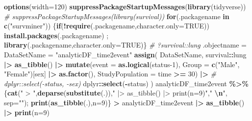 \documentclass[
]{article}
\newenvironment{Shaded}{\begin{snugshade}}{\end{snugshade}}
\newcommand{\AttributeTok}[1]{\textcolor[rgb]{0.13,0.29,0.53}{#1}}
\newcommand{\CommentTok}[1]{\textcolor[rgb]{0.56,0.35,0.01}{\textit{#1}}}
\newcommand{\ConstantTok}[1]{\textcolor[rgb]{0.56,0.35,0.01}{#1}}
\newcommand{\ControlFlowTok}[1]{\textcolor[rgb]{0.13,0.29,0.53}{\textbf{#1}}}
\newcommand{\DecValTok}[1]{\textcolor[rgb]{0.00,0.00,0.81}{#1}}
\newcommand{\FunctionTok}[1]{\textcolor[rgb]{0.13,0.29,0.53}{\textbf{#1}}}
\newcommand{\NormalTok}[1]{#1}
\newcommand{\OtherTok}[1]{\textcolor[rgb]{0.56,0.35,0.01}{#1}}
\newcommand{\SpecialCharTok}[1]{\textcolor[rgb]{0.81,0.36,0.00}{\textbf{#1}}}
\newcommand{\StringTok}[1]{\textcolor[rgb]{0.31,0.60,0.02}{#1}}
\begin{document}
\begin{Shaded}
\begin{Highlighting}[]
\FunctionTok{options}\NormalTok{(}\AttributeTok{width=}\DecValTok{120}\NormalTok{)}
\FunctionTok{suppressPackageStartupMessages}\NormalTok{(}\FunctionTok{library}\NormalTok{(tidyverse))}
\CommentTok{\# suppressPackageStartupMessages(library(survival))}
\ControlFlowTok{for}\NormalTok{(.packagename }\ControlFlowTok{in} \FunctionTok{c}\NormalTok{(}\StringTok{"survminer"}\NormalTok{)) \{}\ControlFlowTok{if}\NormalTok{(}\SpecialCharTok{!}\FunctionTok{require}\NormalTok{(.packagename,}\AttributeTok{character.only=}\ConstantTok{TRUE}\NormalTok{)) }\FunctionTok{install.packages}\NormalTok{(.packagename)  ;  }\FunctionTok{library}\NormalTok{(.packagename,}\AttributeTok{character.only=}\ConstantTok{TRUE}\NormalTok{)\}  }
\CommentTok{\# ?survival::lung}
\NormalTok{.objectname }\OtherTok{=}\NormalTok{ DataSetName }\OtherTok{=} \StringTok{"analyticDF\_time2event"}
\FunctionTok{assign}\NormalTok{(}
\NormalTok{    DataSetName, }
\NormalTok{    survival}\SpecialCharTok{::}\NormalTok{lung }\SpecialCharTok{|\textgreater{}} \FunctionTok{as\_tibble}\NormalTok{() }\SpecialCharTok{|\textgreater{}} \FunctionTok{mutate}\NormalTok{(}\AttributeTok{event =} \FunctionTok{as.logical}\NormalTok{(status}\DecValTok{{-}1}\NormalTok{), }\AttributeTok{Group =} \FunctionTok{c}\NormalTok{(}\StringTok{"Male"}\NormalTok{, }\StringTok{"Female"}\NormalTok{)[sex] }\SpecialCharTok{|\textgreater{}} \FunctionTok{as.factor}\NormalTok{(), }\AttributeTok{StudyPopulation =}\NormalTok{ time }\SpecialCharTok{\textgreater{}=} \DecValTok{30}\NormalTok{) }\SpecialCharTok{|\textgreater{}}
        \CommentTok{\# dplyr::select({-}status, {-}sex)}
\NormalTok{        dplyr}\SpecialCharTok{::}\FunctionTok{select}\NormalTok{(}\SpecialCharTok{{-}}\NormalTok{status)}
\NormalTok{)}
\NormalTok{analyticDF\_time2event }\SpecialCharTok{\%\textgreater{}\%}\NormalTok{ \{}\FunctionTok{cat}\NormalTok{(}\StringTok{" \textgreater{} "}\NormalTok{,}\FunctionTok{deparse}\NormalTok{(}\FunctionTok{substitute}\NormalTok{(.)),}\StringTok{" |\textgreater{} as\_tibble() |\textgreater{} print(n=9)"}\NormalTok{,}\StringTok{"  }\SpecialCharTok{\textbackslash{}n}\StringTok{"}\NormalTok{, }\AttributeTok{sep=}\StringTok{""}\NormalTok{); }\FunctionTok{print}\NormalTok{(}\FunctionTok{as\_tibble}\NormalTok{(.),}\AttributeTok{n=}\DecValTok{9}\NormalTok{)\}}
 \SpecialCharTok{\textgreater{}}\NormalTok{ analyticDF\_time2event }\SpecialCharTok{|\textgreater{}} \FunctionTok{as\_tibble}\NormalTok{() }\SpecialCharTok{|\textgreater{}} \FunctionTok{print}\NormalTok{(}\AttributeTok{n=}\DecValTok{9}\NormalTok{)  }

\end{Highlighting}
\end{Shaded}
\end{document}
